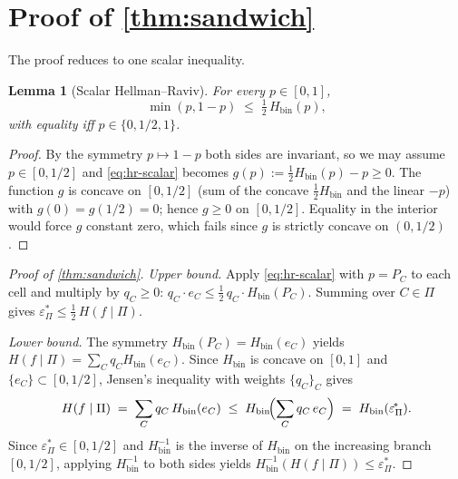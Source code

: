 \documentclass[10pt]{article}
\newtheorem{lemma}[theorem]{Lemma}
\theoremstyle{definition}
\theoremstyle{remark}
\newcommand{\Hbin}{H_{\mathrm{bin}}}
\newcommand{\Hinv}{H_{\mathrm{bin}}^{-1}}
\newcommand{\eps}{\varepsilon}
\newcommand{\epsP}{\eps^{\!*}_{\Pi}}
\begin{document}
\section{Proof of \cref{thm:sandwich}}\label{sec:proof}

The proof reduces to one scalar inequality.

\begin{lemma}[Scalar Hellman--Raviv]\label{lem:scalar}
For every $p \in [0, 1]$,
\begin{equation}\label{eq:hr-scalar}
  \min(p, 1 - p) \;\le\; \tfrac{1}{2}\,\Hbin(p),
\end{equation}
with equality iff $p \in \{0, 1/2, 1\}$.
\end{lemma}

\begin{proof}
By the symmetry $p \mapsto 1-p$ both sides are invariant, so we
may assume $p \in [0, 1/2]$ and \eqref{eq:hr-scalar} becomes
$g(p) := \tfrac{1}{2}\Hbin(p) - p \ge 0$. The function $g$ is
concave on $[0, 1/2]$ (sum of the concave $\tfrac{1}{2}\Hbin$ and
the linear $-p$) with $g(0) = g(1/2) = 0$; hence $g \ge 0$ on
$[0, 1/2]$. Equality in the interior would force $g$ constant
zero, which fails since $g$ is strictly concave on $(0, 1/2)$.
\end{proof}

\begin{proof}[Proof of \cref{thm:sandwich}]
\emph{Upper bound.} Apply \eqref{eq:hr-scalar} with $p = P_{C}$
to each cell and multiply by $q_{C} \ge 0$:
\(
  q_{C} \cdot e_{C} \le \tfrac{1}{2}\, q_{C} \cdot \Hbin(P_{C}).
\)
Summing over $C \in \Pi$ gives $\epsP \le \tfrac{1}{2}\,H(f\mid\Pi)$.

\emph{Lower bound.} The symmetry $\Hbin(P_{C}) = \Hbin(e_{C})$
yields $H(f \mid \Pi) = \sum_{C} q_{C} \Hbin(e_{C})$. Since
$\Hbin$ is concave on $[0, 1]$ and $\{e_{C}\} \subset [0, 1/2]$,
Jensen's inequality with weights $\{q_{C}\}_{C}$ gives
\[
  H(f \mid \Pi)
  \;=\; \sum_{C} q_{C}\,\Hbin(e_{C})
  \;\le\; \Hbin\!\Bigl(\sum_{C} q_{C}\, e_{C}\Bigr)
  \;=\; \Hbin(\epsP).
\]
Since $\epsP \in [0, 1/2]$ and $\Hinv$ is the inverse of $\Hbin$
on the increasing branch $[0, 1/2]$, applying $\Hinv$ to both
sides yields $\Hinv(H(f \mid \Pi)) \le \epsP$.
\end{proof}
\end{document}
